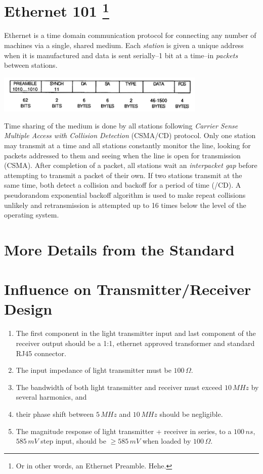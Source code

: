 \documentclass{article}
\begin{document}
\section[title]{Ethernet 101 \footnote{Or in other words, an Ethernet Preamble. Hehe.}}

Ethernet is a time domain communication protocol for connecting any number of
machines via a single, shared medium.
Each \textit{station} is given a unique address when it is manufactured and
data is sent serially--1 bit at a time--in \textit{packets} between
stations.

\begin{center}
	\includegraphics[width=0.75\textwidth]{ethernet-packet.pdf}
	\label{packet-format}
\end{center}

Time sharing of the medium is done by all stations following
\textit{Carrier Sense Multiple Access with Collision Detection}
(CSMA/CD) protocol.
Only one station may transmit at a time and all stations constantly
monitor the line, looking for packets addressed to them and seeing when
the line is open for transmission (CSMA).
After completion of a packet, all stations wait an
\textit{interpacket gap} before attempting to transmit a packet of their own.
If two stations transmit at the same time, both detect a collision
and backoff for a period of time (/CD).
A pseudorandom exponential backoff algorithm is used to make repeat
collisions unlikely and retransmission is attempted up to 16 times
below the level of the operating system.

\section{More Details from the Standard}


\section{Influence on Transmitter/Receiver Design}

\begin{enumerate}
\item The first component in the light transmitter input
and last component of the receiver output should be a 1:1, ethernet approved
transformer and standard RJ45 connector.
\item The input impedance of light transmitter must be $100\,\Omega$.
\item The bandwidth of both light transmitter and receiver must exceed $10\,MHz$
by several harmonics, and
\item their phase shift between $5\,MHz$ and $10\,MHz$ should be negligible.
\item The magnitude response of light transmitter + receiver in series,
to a $100\,ns$, $585\,mV$ step input, should be $\geq585\,mV$ when loaded by $100\,\Omega$.
\end{enumerate}
\end{document}
